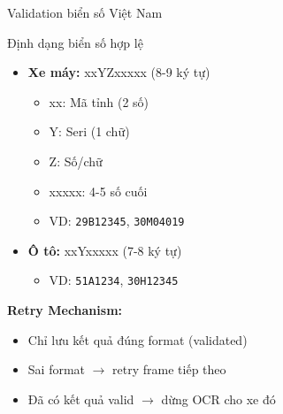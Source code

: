 \begin{frame}{Validation biển số Việt Nam}
    \begin{block}{Định dạng biển số hợp lệ}
    \begin{itemize}
        \item \textbf{Xe máy:} xxYZxxxxx (8-9 ký tự)
        \begin{itemize}
            \item xx: Mã tỉnh (2 số)
            \item Y: Seri (1 chữ)
            \item Z: Số/chữ
            \item xxxxx: 4-5 số cuối
            \item VD: \texttt{29B12345}, \texttt{30M04019}
        \end{itemize}
        \item \textbf{Ô tô:} xxYxxxxx (7-8 ký tự)
        \begin{itemize}
            \item VD: \texttt{51A1234}, \texttt{30H12345}
        \end{itemize}
    \end{itemize}
    \end{block}

    \textbf{Retry Mechanism:}
    \begin{itemize}
        \item Chỉ lưu kết quả đúng format (validated)
        \item Sai format $\rightarrow$ retry frame tiếp theo
        \item Đã có kết quả valid $\rightarrow$ dừng OCR cho xe đó
    \end{itemize}
\end{frame}
